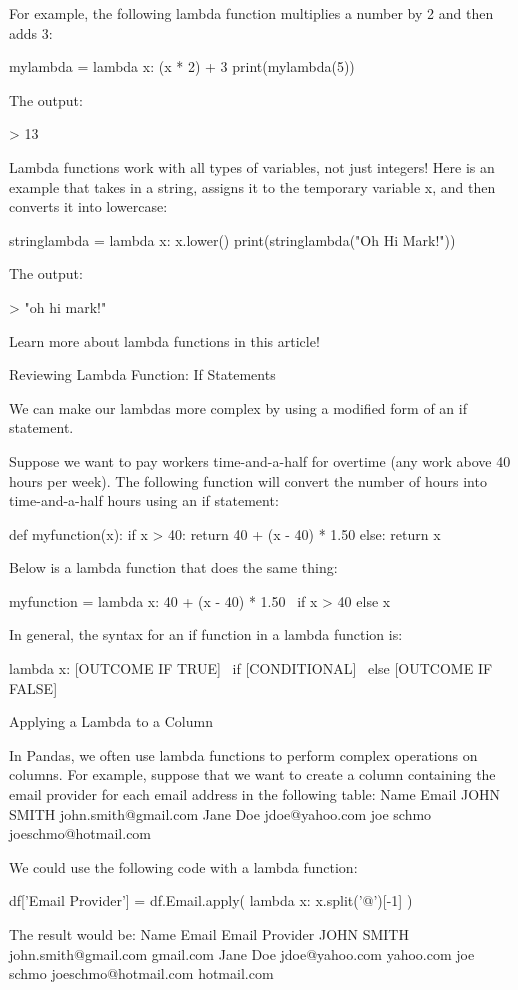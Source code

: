 \documentclass{journal}
\begin{document}
For example, the following lambda function multiplies a number by 2 and then adds 3:

mylambda = lambda x: (x * 2) + 3
print(mylambda(5))

The output:

> 13

Lambda functions work with all types of variables, not just integers! Here is an example that takes in a string, assigns it to the temporary variable x, and then converts it into lowercase:

stringlambda = lambda x: x.lower()
print(stringlambda("Oh Hi Mark!"))

The output:

> "oh hi mark!"

Learn more about lambda functions in this article!


Reviewing Lambda Function: If Statements

We can make our lambdas more complex by using a modified form of an if statement.

Suppose we want to pay workers time-and-a-half for overtime (any work above 40 hours per week). The following function will convert the number of hours into time-and-a-half hours using an if statement:

def myfunction(x):
    if x > 40:
        return 40 + (x - 40) * 1.50
    else:
        return x

Below is a lambda function that does the same thing:

myfunction = lambda x: 40 + (x - 40) * 1.50 \
    if x > 40 else x

In general, the syntax for an if function in a lambda function is:

lambda x: [OUTCOME IF TRUE] \
    if [CONDITIONAL] \
    else [OUTCOME IF FALSE]

Applying a Lambda to a Column

In Pandas, we often use lambda functions to perform complex operations on columns. For example, suppose that we want to create a column containing the email provider for each email address in the following table:
Name 	Email
JOHN SMITH 	john.smith@gmail.com
Jane Doe 	jdoe@yahoo.com
joe schmo 	joeschmo@hotmail.com

We could use the following code with a lambda function:

df['Email Provider'] = df.Email.apply(
    lambda x: x.split('@')[-1]
    )

The result would be:
Name 	Email 	Email Provider
JOHN SMITH 	john.smith@gmail.com 	gmail.com
Jane Doe 	jdoe@yahoo.com 	yahoo.com
joe schmo 	joeschmo@hotmail.com 	hotmail.com
\end{document}
